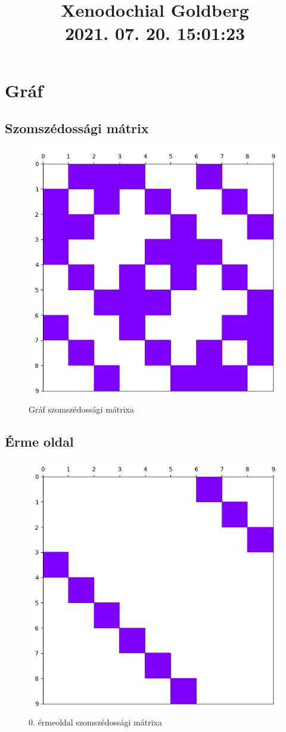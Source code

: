 \documentclass[14pt,a4paper]{article}
\title{Xenodochial Goldberg \\ \large 2021. 07. 20. 15:01:23}
\author{}
\date{}
\begin{document}
\maketitle
\section{Gráf}
\subsection{Szomszédossági mátrix}
\begin{figure}[H]
\centering
\includegraphics[width = 0.7\columnwidth]{graph/graph.jpg}
\caption{Gráf szomszédossági mátrixa}
\end{figure}
\subsection{Érme oldal}
\begin{figure}[H]
\centering
\includegraphics[width = 0.7\columnwidth]{coin_faces/coin_face_00.jpg}
\caption{0. érmeoldal szomszédossági mátrixa}
\end{figure}
\end{document}
